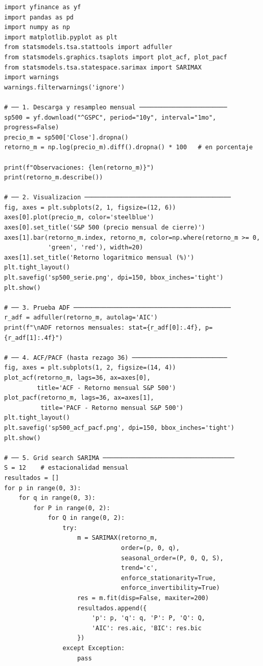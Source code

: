 \documentclass[12pt,a4paper]{article}
\begin{document}
\begin{lstlisting}[caption={Ejemplo 2: SARIMA para S\&P 500 mensual},label=lst:sp500]
import yfinance as yf
import pandas as pd
import numpy as np
import matplotlib.pyplot as plt
from statsmodels.tsa.stattools import adfuller
from statsmodels.graphics.tsaplots import plot_acf, plot_pacf
from statsmodels.tsa.statespace.sarimax import SARIMAX
import warnings
warnings.filterwarnings('ignore')

# ── 1. Descarga y resampleo mensual ────────────────────────
sp500 = yf.download("^GSPC", period="10y", interval="1mo", progress=False)
precio_m = sp500['Close'].dropna()
retorno_m = np.log(precio_m).diff().dropna() * 100   # en porcentaje

print(f"Observaciones: {len(retorno_m)}")
print(retorno_m.describe())

# ── 2. Visualizacion ────────────────────────────────────────
fig, axes = plt.subplots(2, 1, figsize=(12, 6))
axes[0].plot(precio_m, color='steelblue')
axes[0].set_title('S&P 500 (precio mensual de cierre)')
axes[1].bar(retorno_m.index, retorno_m, color=np.where(retorno_m >= 0,
            'green', 'red'), width=20)
axes[1].set_title('Retorno logaritmico mensual (%)')
plt.tight_layout()
plt.savefig('sp500_serie.png', dpi=150, bbox_inches='tight')
plt.show()

# ── 3. Prueba ADF ───────────────────────────────────────────
r_adf = adfuller(retorno_m, autolag='AIC')
print(f"\nADF retornos mensuales: stat={r_adf[0]:.4f}, p={r_adf[1]:.4f}")

# ── 4. ACF/PACF (hasta rezago 36) ──────────────────────────
fig, axes = plt.subplots(1, 2, figsize=(14, 4))
plot_acf(retorno_m, lags=36, ax=axes[0],
         title='ACF - Retorno mensual S&P 500')
plot_pacf(retorno_m, lags=36, ax=axes[1],
          title='PACF - Retorno mensual S&P 500')
plt.tight_layout()
plt.savefig('sp500_acf_pacf.png', dpi=150, bbox_inches='tight')
plt.show()

# ── 5. Grid search SARIMA ────────────────────────────────────
S = 12    # estacionalidad mensual
resultados = []
for p in range(0, 3):
    for q in range(0, 3):
        for P in range(0, 2):
            for Q in range(0, 2):
                try:
                    m = SARIMAX(retorno_m,
                                order=(p, 0, q),
                                seasonal_order=(P, 0, Q, S),
                                trend='c',
                                enforce_stationarity=True,
                                enforce_invertibility=True)
                    res = m.fit(disp=False, maxiter=200)
                    resultados.append({
                        'p': p, 'q': q, 'P': P, 'Q': Q,
                        'AIC': res.aic, 'BIC': res.bic
                    })
                except Exception:
                    pass


\end{lstlisting}
\end{document}
